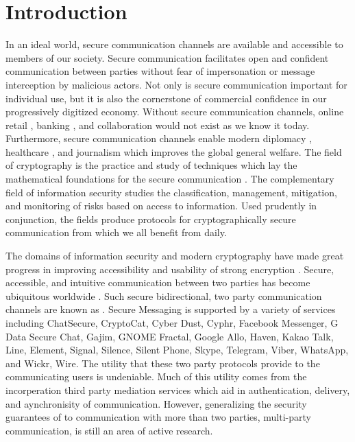 \hypertarget{sec:introduction}{%
\chapter{Introduction}\label{sec:introduction}}

In an ideal world, secure communication channels are available and accessible to members of our society.
Secure communication facilitates open and confident communication between parties without fear of impersonation or message interception by malicious actors.
Not only is secure communication important for individual use, but it is also the cornerstone of commercial confidence in our progressively digitized economy.
Without secure communication channels, online retail \autocite{chen2010consumer, chakraborty2016online}, banking \autocite{karim2009towards,hisamatsu2010online}, and collaboration \autocite{JOSHI2017128} would not exist as we know it today.
Furthermore, secure communication channels enable modern diplomacy \autocite{pauletto2020information}, healthcare \autocite{doi:10.1080/17538157.2022.2049274, kuo2016secure}, and journalism \autocite{taylor2015need, di2022information} which improves the global general welfare.
The field of cryptography is the practice and study of techniques which lay the mathematical foundations for the secure communication \autocite{schneier2007applied}.
The complementary field of information security studies the classification, management, mitigation, and monitoring of risks \autocite{blakley2001information,anderson2003we} based on access to information.
Used prudently in conjunction, the fields produce protocols for cryptographically secure communication from which we all benefit from daily.

The domains of information security and modern cryptography have made great progress in improving accessibility and usability of strong encryption \autocite{sheng2006johnny, hof2015towards, bai2016inconvenient, bai2017balancing, wang2017usability}.
Secure, accessible, and intuitive communication between two parties has become ubiquitous worldwide \autocite{schroder2016signal, cronin2015growth, shenson2016rapid, HOONAKKER201763, vaziripour2017you, jahn2018usability}.
Such secure bidirectional, two party communication channels are known as  \autocite{unger2015sok}.
Secure Messaging is supported by a variety of services \autocite{mujaj2017comparison} including ChatSecure, CryptoCat, Cyber Dust, Cyphr, Facebook Messenger, G Data Secure Chat, Gajim, GNOME Fractal, Google Allo, Haven, Kakao Talk, Line, Element, Signal, Silence, Silent Phone, Skype, Telegram, Viber, WhatsApp, and Wickr, Wire.
The utility that these two party protocols provide to the communicating users is undeniable.
Much of this utility comes from the incorperation third party mediation services which aid in authentication, delivery, and aynchronisity of communication.
However, generalizing the security guarantees of  to communication with more than two parties, multi-party communication, is still an area of active research.

